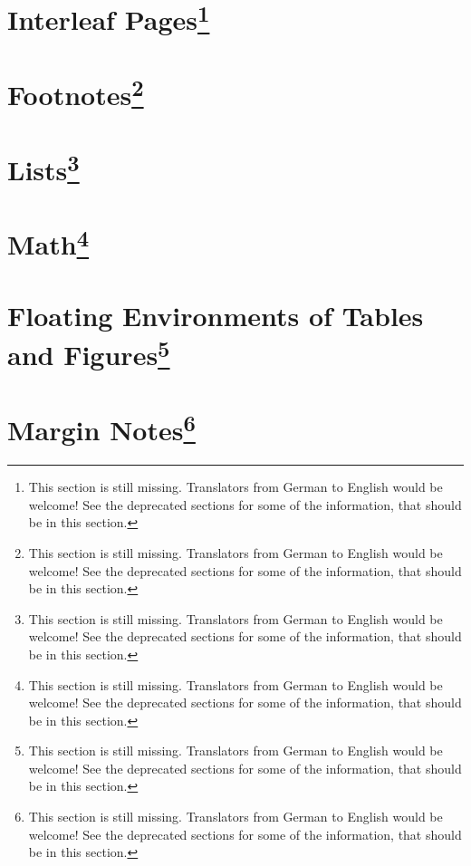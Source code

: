 \section{Interleaf Pages\protect\footnote{This section is still missing. Translators
    from German to English would be welcome! See the deprecated sections for
    some of the information, that should be in this section.}}
\label{sec:scrlttr2.stillmissing}
\mbox{}

\section{Footnotes\protect\footnote{This section is still missing. Translators
    from German to English would be welcome! See the deprecated sections for
    some of the information, that should be in this section.}}
\label{sec:scrlttr2.stillmissing}
\mbox{}

\section{Lists\protect\footnote{This section is still missing. Translators
    from German to English would be welcome! See the deprecated sections for
    some of the information, that should be in this section.}}
\label{sec:scrlttr2.stillmissing}
\mbox{}

\section{Math\protect\footnote{This section is still missing. Translators
    from German to English would be welcome! See the deprecated sections for
    some of the information, that should be in this section.}}
\label{sec:scrlttr2.stillmissing}
\mbox{}

\section{Floating Environments of Tables and Figures\protect\footnote{This section is still missing. Translators
    from German to English would be welcome! See the deprecated sections for
    some of the information, that should be in this section.}}
\label{sec:scrlttr2.stillmissing}
\mbox{}

\section{Margin Notes\protect\footnote{This section is still missing. Translators
    from German to English would be welcome! See the deprecated sections for
    some of the information, that should be in this section.}}
\label{sec:scrlttr2.stillmissing}
\mbox{}

